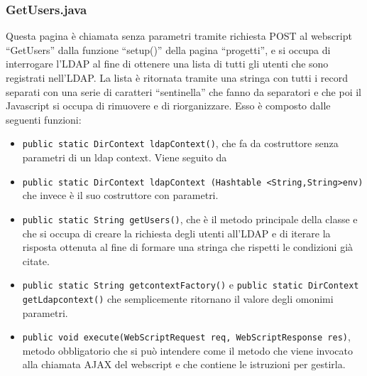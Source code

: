 \subsubsection{GetUsers.java}
Questa pagina è chiamata senza parametri tramite richiesta POST al webscript “GetUsers” dalla funzione “setup()” della pagina “progetti”, e si occupa di interrogare l’LDAP al fine di ottenere una lista di tutti gli utenti che sono registrati nell’LDAP. La lista è ritornata tramite una stringa con tutti i record separati con una serie di caratteri “sentinella” che fanno da separatori e che poi il Javascript si occupa di rimuovere e di riorganizzare. Esso è composto dalle seguenti funzioni:
\begin{itemize}
\item \texttt{public static DirContext ldapContext()}, che fa da costruttore senza parametri di un ldap context. Viene seguito da
\item \texttt{public static DirContext ldapContext (Hashtable <String,String>env)} che invece è il suo costruttore con parametri.
\item \texttt{public static String getUsers()}, che è il metodo principale della classe e che si occupa di creare la richiesta degli utenti all’LDAP e di iterare la risposta ottenuta al fine di formare una stringa che rispetti le condizioni già citate.
\item \texttt{public static String getcontextFactory()} e \texttt{public static DirContext getLdapcontext()} che  semplicemente ritornano il valore degli omonimi  parametri.
\item \texttt{public void execute(WebScriptRequest req, WebScriptResponse res)}, metodo obbligatorio che si può intendere come il metodo che viene invocato alla chiamata AJAX del webscript e che contiene le istruzioni per gestirla.
\end{itemize}

